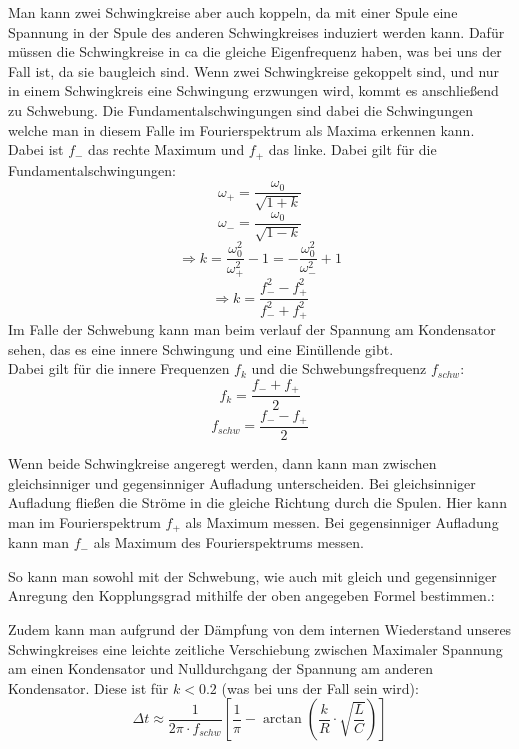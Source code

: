 \documentclass[twoside]{protokoll}
\begin{document}
Man kann zwei Schwingkreise aber auch koppeln, da mit einer Spule eine Spannung in der Spule des anderen Schwingkreises induziert werden kann.
Dafür müssen die Schwingkreise in ca die gleiche Eigenfrequenz haben, was bei uns der Fall ist, da sie baugleich sind.
Wenn zwei Schwingkreise gekoppelt sind, und nur in einem Schwingkreis eine Schwingung erzwungen wird, kommt es anschließend zu Schwebung.
Die Fundamentalschwingungen sind dabei die Schwingungen welche man in diesem Falle im Fourierspektrum als Maxima erkennen kann.
Dabei ist $f_-$ das rechte Maximum und $f_+$ das linke.
Dabei gilt für die Fundamentalschwingungen:
\begin{equation}
    \omega_+ = \frac{\omega_0}{\sqrt{1 + k}}
\end{equation}
\begin{equation}
    \omega_- = \frac{\omega_0}{\sqrt{1 - k}}
\end{equation}
\begin{equation}
    \Rightarrow k = \frac{\omega_0^2}{\omega_+^2} - 1 = - \frac{\omega_0^2}{\omega_-^2} + 1
\end{equation}
\begin{equation}
    \Rightarrow k = \frac{f_-^2 - f_+^2}{f_-^2 + f_+^2}
\end{equation}
Im Falle der Schwebung kann man beim verlauf der Spannung am Kondensator sehen, das es eine innere Schwingung und eine Einüllende gibt. \\
Dabei gilt für die innere Frequenzen $f_k$ und die Schwebungsfrequenz $f_{schw}$:
\begin{equation}
    f_k = \frac{f_- + f_+}{2}
\end{equation}
\begin{equation}
    f_{schw} = \frac{f_- - f_+}{2}
\end{equation}
    

Wenn beide Schwingkreise angeregt werden, dann kann man zwischen gleichsinniger und gegensinniger Aufladung unterscheiden.
Bei gleichsinniger Aufladung fließen die Ströme in die gleiche Richtung durch die Spulen.
Hier kann man im Fourierspektrum $f_+$ als Maximum messen.
Bei gegensinniger Aufladung kann man $f_-$ als Maximum des Fourierspektrums messen.

So kann man sowohl mit der Schwebung, wie auch mit gleich und gegensinniger Anregung den Kopplungsgrad mithilfe der oben angegeben Formel bestimmen.:

Zudem kann man aufgrund der Dämpfung von dem internen Wiederstand unseres Schwingkreises eine leichte zeitliche Verschiebung zwischen Maximaler Spannung am einen Kondensator und Nulldurchgang der Spannung am anderen Kondensator.
Diese ist für $ k < 0.2$ (was bei uns der Fall sein wird):
\begin{equation}
    \Delta t \approx \frac{1}{2 \pi \cdot f_{schw}} \left[ \frac{1}{\pi} - \arctan{\left( \frac{k}{R} \cdot \sqrt{\frac{L}{C}} \right)} \right]
   \label{DeltaT}
\end{equation}
\end{document}
